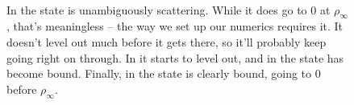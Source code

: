 \documentclass[12pt,twoside]{reedthesis}
\begin{document}
\begin{figure}
\centering {}
 \\ 
\caption[The progression of an eigenstate from scattering to bound]
{In  the state is unambiguously scattering. While it does go to 0 at $\rho_{\infty}$, that's meaningless -- the way we set up our numerics requires it. It doesn't level out much before it gets there, so it'll probably keep going right on through. In  it starts to level out, and in  the state has become bound. Finally, in  the state is clearly bound, going to 0 before $\rho_{\infty}$.}%
\label{fig:scatt-to-bound}
\end{figure}
\end{document}
